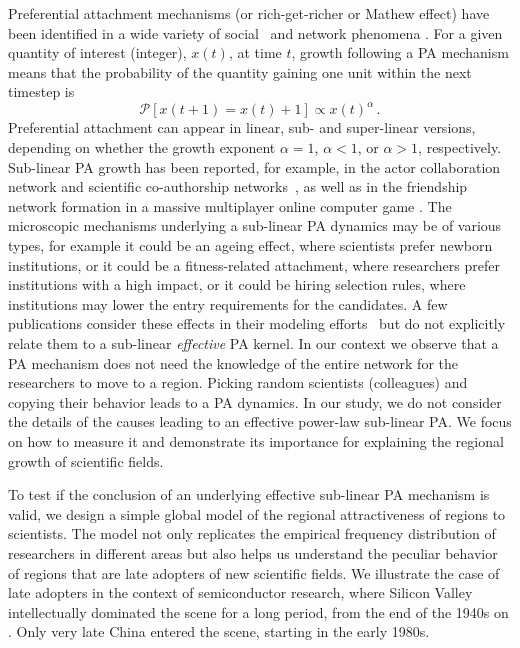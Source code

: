 \documentclass[draft,final]{vutinfth} %
\begin{document}
Preferential attachment mechanisms (or rich-get-richer or Mathew effect) have been identified in a wide variety of social~\cite{Price76,Simkin11,bol18,capocci06} and network phenomena \cite{Krapivsky00,Newman01,jeong03}. For a  given quantity of interest (integer), $x(t)$, at time $t$, growth following a PA mechanism means that the probability of the quantity gaining one unit within the next timestep is 
\begin{equation}
    \mathcal{P}[  x(t+1) = x(t)+1 ]\propto x(t)^{\alpha} \, .
    \label{eq:genericPA}
\end{equation}
Preferential attachment can appear in linear, sub- and super-linear versions, depending on whether the growth exponent $\alpha=1$, $\alpha<1$, or $\alpha>1$, respectively. Sub-linear PA growth has been reported, for example, in the actor collaboration network and scientific co-authorship networks~\cite{jeong03, Newman01}, as well as in the friendship network formation in a massive multiplayer online computer game \cite{szell11}.
The microscopic mechanisms underlying a sub-linear PA dynamics may be of various types, for example it could be an ageing effect, where scientists prefer newborn institutions, or it could be a fitness-related attachment, where researchers prefer institutions with a high impact, or it could be hiring selection rules, where institutions may lower the entry requirements for the candidates.
A few publications consider these effects in their modeling efforts~\cite{reisz22,wang13,jin19,gleeson14} but do not explicitly relate them to a sub-linear \emph{effective} PA kernel.
In our context we observe that a PA mechanism does not need the knowledge of the entire network for the researchers to move to a region. Picking random scientists (colleagues) and copying their behavior leads to a PA dynamics.
In our study, we do not consider the details of the causes leading to an effective power-law sub-linear PA. We focus on how to measure it and demonstrate its importance for explaining the regional growth of scientific fields.


To test if the conclusion of an underlying effective sub-linear PA mechanism is valid, we design a simple global model of the regional attractiveness of regions to scientists. The model not only replicates the empirical frequency distribution of researchers in different areas but also helps us understand the peculiar behavior of regions that are late adopters of new scientific fields. We illustrate the case of late adopters in the context of semiconductor research, where Silicon Valley intellectually dominated the scene for a long period, from the end of the 1940s on \cite{rao13}. Only very late China entered the scene, starting in the early 1980s. 
\end{document}
